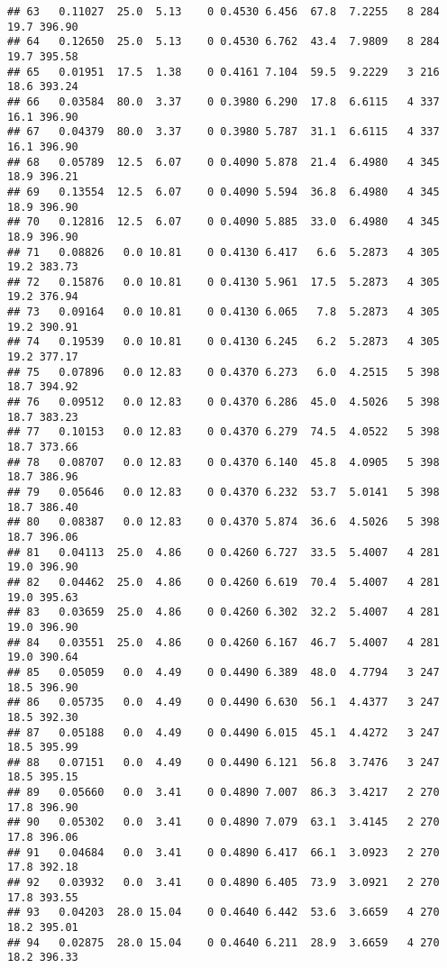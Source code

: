 \documentclass[
]{article}
\begin{document}
\begin{verbatim}
## 63   0.11027  25.0  5.13    0 0.4530 6.456  67.8  7.2255   8 284    19.7 396.90
## 64   0.12650  25.0  5.13    0 0.4530 6.762  43.4  7.9809   8 284    19.7 395.58
## 65   0.01951  17.5  1.38    0 0.4161 7.104  59.5  9.2229   3 216    18.6 393.24
## 66   0.03584  80.0  3.37    0 0.3980 6.290  17.8  6.6115   4 337    16.1 396.90
## 67   0.04379  80.0  3.37    0 0.3980 5.787  31.1  6.6115   4 337    16.1 396.90
## 68   0.05789  12.5  6.07    0 0.4090 5.878  21.4  6.4980   4 345    18.9 396.21
## 69   0.13554  12.5  6.07    0 0.4090 5.594  36.8  6.4980   4 345    18.9 396.90
## 70   0.12816  12.5  6.07    0 0.4090 5.885  33.0  6.4980   4 345    18.9 396.90
## 71   0.08826   0.0 10.81    0 0.4130 6.417   6.6  5.2873   4 305    19.2 383.73
## 72   0.15876   0.0 10.81    0 0.4130 5.961  17.5  5.2873   4 305    19.2 376.94
## 73   0.09164   0.0 10.81    0 0.4130 6.065   7.8  5.2873   4 305    19.2 390.91
## 74   0.19539   0.0 10.81    0 0.4130 6.245   6.2  5.2873   4 305    19.2 377.17
## 75   0.07896   0.0 12.83    0 0.4370 6.273   6.0  4.2515   5 398    18.7 394.92
## 76   0.09512   0.0 12.83    0 0.4370 6.286  45.0  4.5026   5 398    18.7 383.23
## 77   0.10153   0.0 12.83    0 0.4370 6.279  74.5  4.0522   5 398    18.7 373.66
## 78   0.08707   0.0 12.83    0 0.4370 6.140  45.8  4.0905   5 398    18.7 386.96
## 79   0.05646   0.0 12.83    0 0.4370 6.232  53.7  5.0141   5 398    18.7 386.40
## 80   0.08387   0.0 12.83    0 0.4370 5.874  36.6  4.5026   5 398    18.7 396.06
## 81   0.04113  25.0  4.86    0 0.4260 6.727  33.5  5.4007   4 281    19.0 396.90
## 82   0.04462  25.0  4.86    0 0.4260 6.619  70.4  5.4007   4 281    19.0 395.63
## 83   0.03659  25.0  4.86    0 0.4260 6.302  32.2  5.4007   4 281    19.0 396.90
## 84   0.03551  25.0  4.86    0 0.4260 6.167  46.7  5.4007   4 281    19.0 390.64
## 85   0.05059   0.0  4.49    0 0.4490 6.389  48.0  4.7794   3 247    18.5 396.90
## 86   0.05735   0.0  4.49    0 0.4490 6.630  56.1  4.4377   3 247    18.5 392.30
## 87   0.05188   0.0  4.49    0 0.4490 6.015  45.1  4.4272   3 247    18.5 395.99
## 88   0.07151   0.0  4.49    0 0.4490 6.121  56.8  3.7476   3 247    18.5 395.15
## 89   0.05660   0.0  3.41    0 0.4890 7.007  86.3  3.4217   2 270    17.8 396.90
## 90   0.05302   0.0  3.41    0 0.4890 7.079  63.1  3.4145   2 270    17.8 396.06
## 91   0.04684   0.0  3.41    0 0.4890 6.417  66.1  3.0923   2 270    17.8 392.18
## 92   0.03932   0.0  3.41    0 0.4890 6.405  73.9  3.0921   2 270    17.8 393.55
## 93   0.04203  28.0 15.04    0 0.4640 6.442  53.6  3.6659   4 270    18.2 395.01
## 94   0.02875  28.0 15.04    0 0.4640 6.211  28.9  3.6659   4 270    18.2 396.33

\end{verbatim}
\end{document}
